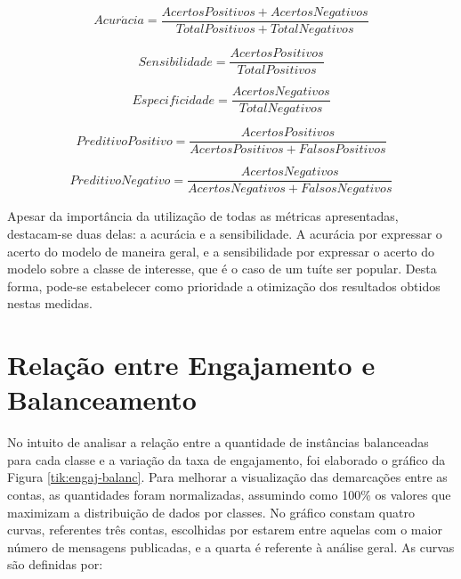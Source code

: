 \documentclass[oneside,openright,12pt]{ufsm_2015} %
\begin{document}
    \begin{equation} \label{eq:acuracidade}
    Acur\acute{a}cia = \frac{AcertosPositivos + AcertosNegativos}{TotalPositivos + TotalNegativos}
    \end{equation}
    
    \begin{equation} \label{eq:sensibilidade}
    Sensibilidade = \frac{AcertosPositivos}{TotalPositivos}
    \end{equation}
    
    \begin{equation} \label{eq:especificidade}
    Especificidade = \frac{AcertosNegativos}{TotalNegativos}
    \end{equation}
    
    \begin{equation} \label{eq:predit-pos}
    PreditivoPositivo = \frac{AcertosPositivos}{AcertosPositivos + FalsosPositivos}
    \end{equation}
    
    \begin{equation} \label{eq:predit-neg}
    PreditivoNegativo = \frac{AcertosNegativos}{AcertosNegativos + FalsosNegativos}
    \end{equation}
    
    \par Apesar da importância da utilização de todas as métricas apresentadas, destacam-se duas delas: a acurácia e a sensibilidade. A acurácia por expressar o acerto do modelo de maneira geral, e a sensibilidade por expressar o acerto do modelo sobre a classe de interesse, que é o caso de um tuíte ser popular. Desta forma, pode-se estabelecer como prioridade a otimização dos resultados obtidos nestas medidas.
    

\section{Relação entre Engajamento e Balanceamento}
\label{sec:exp-engaj-balanc}

    \par No intuito de analisar a relação entre a quantidade de instâncias balanceadas para cada classe e a variação da taxa de engajamento, foi elaborado o gráfico da Figura \ref{tik:engaj-balanc}. Para melhorar a visualização das demarcações entre as contas, as quantidades foram normalizadas, assumindo como 100\% os valores que maximizam a distribuição de dados por classes. No gráfico constam quatro curvas, referentes três contas, escolhidas por estarem entre aquelas com o maior número de mensagens publicadas, e a quarta é referente à análise geral. As curvas são definidas por: 
    
\end{document}
